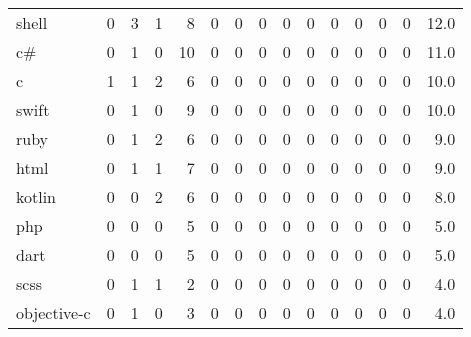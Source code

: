 \begin{tabular}{lrrrrrrrrrrrrrr}
shell            &        0 &       3 &          1 &               8 &                0 &       0 &          0 &          0 &         0 &         0 &      0 &             0 &         0 &     12.0 \\
c\#               &        0 &       1 &          0 &              10 &                0 &       0 &          0 &          0 &         0 &         0 &      0 &             0 &         0 &     11.0 \\
c                &        1 &       1 &          2 &               6 &                0 &       0 &          0 &          0 &         0 &         0 &      0 &             0 &         0 &     10.0 \\
swift            &        0 &       1 &          0 &               9 &                0 &       0 &          0 &          0 &         0 &         0 &      0 &             0 &         0 &     10.0 \\
ruby             &        0 &       1 &          2 &               6 &                0 &       0 &          0 &          0 &         0 &         0 &      0 &             0 &         0 &      9.0 \\
html             &        0 &       1 &          1 &               7 &                0 &       0 &          0 &          0 &         0 &         0 &      0 &             0 &         0 &      9.0 \\
kotlin           &        0 &       0 &          2 &               6 &                0 &       0 &          0 &          0 &         0 &         0 &      0 &             0 &         0 &      8.0 \\
php              &        0 &       0 &          0 &               5 &                0 &       0 &          0 &          0 &         0 &         0 &      0 &             0 &         0 &      5.0 \\
dart             &        0 &       0 &          0 &               5 &                0 &       0 &          0 &          0 &         0 &         0 &      0 &             0 &         0 &      5.0 \\
scss             &        0 &       1 &          1 &               2 &                0 &       0 &          0 &          0 &         0 &         0 &      0 &             0 &         0 &      4.0 \\
objective-c      &        0 &       1 &          0 &               3 &                0 &       0 &          0 &          0 &         0 &         0 &      0 &             0 &         0 &      4.0 \\

\end{tabular}
